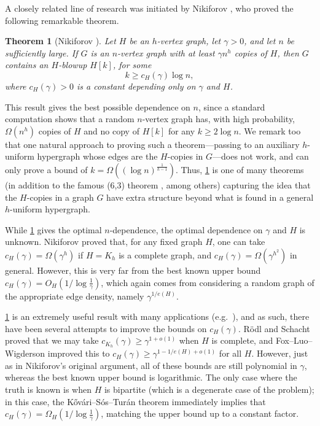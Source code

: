 \documentclass[11pt]{article}
\numberwithin{equation}{section}
\theoremstyle{plain}
\newtheorem{theorem}{Theorem}[section]
\theoremstyle{remark}
\begin{document}
A closely related line of research was initiated by Nikiforov \cite{MR2409174,MR2398823}, who proved the following remarkable theorem. 
\begin{theorem}[Nikiforov \cite{MR2409174,MR2398823}]\label{thm:nikiforov}
    Let $H$ be an $h$-vertex graph, let $\gamma>0$, and let $n$ be sufficiently large. If $G$ is an $n$-vertex graph with at least $\gamma n^h$ copies of $H$, then $G$ contains an $H$-blowup $H[k]$, for some
    \[
        k \geq c_H(\gamma) \log n,
    \]
    where $c_H(\gamma)>0$ is a constant depending only on $\gamma$ and $H$.
\end{theorem}
This result gives the best possible dependence on $n$, since a standard computation shows that a random $n$-vertex graph has, with high probability, $\Omega(n^h)$ copies of $H$ and no copy of $H[k]$ for any $k \geq 2\log n$. We remark too that one natural approach to proving such a theorem---passing to an auxiliary $h$-uniform hypergraph whose edges are the $H$-copies in $G$---does not work, and can only prove a bound of $k = \Omega((\log n)^{\frac{1}{h-1}})$. Thus, \cref{thm:nikiforov} is one of many theorems (in addition to the famous (6,3) theorem \cite{MR0519318}, among others) capturing the idea that the $H$-copies in a graph $G$ have extra structure beyond what is found in a general $h$-uniform hypergraph.

While \cref{thm:nikiforov} gives the optimal $n$-dependence, the optimal dependence on $\gamma$ and $H$ is unknown. Nikiforov proved that, for any fixed graph $H$, one can take $c_{H}(\gamma) = \Omega(\gamma^{h})$ if $H=K_h$ is a complete graph, and $c_H(\gamma)=\Omega(\gamma^{h^2})$ in general. However, this is very far from the best known upper bound $c_H(\gamma) = O_H(1/{\log \frac 1 \gamma})$, which again comes from considering a random graph of the appropriate edge density, namely $\gamma^{1/e(H)}$.

\cref{thm:nikiforov} is an extremely useful result with many applications (e.g.\ \cite{MR2520282,MR2993136,MR4625871,MR4195582}), and as such, there have been several attempts to improve the bounds on $c_H(\gamma)$. R\"odl and Schacht \cite{MR2993136} proved that we may take $c_{K_h}(\gamma) \geq \gamma^{1+o(1)}$ when $H$ is complete, and Fox--Luo--Wigderson \cite{MR4195582} improved this to $c_H(\gamma) \geq \gamma^{1-1/e(H)+o(1)}$ for all $H$. However, just as in Nikiforov's original argument, all of these bounds are still polynomial in $\gamma$, whereas the best known upper bound is logarithmic. The only case where the truth is known is when $H$ is bipartite (which is a degenerate case of the problem); in this case, the K\H ov\'ari--S\'os--Tur\'an theorem \cite{MR0065617} immediately implies that $c_H(\gamma) = \Omega_H(1/{\log \frac 1\gamma})$, matching the upper bound up to a constant factor.
\end{document}
